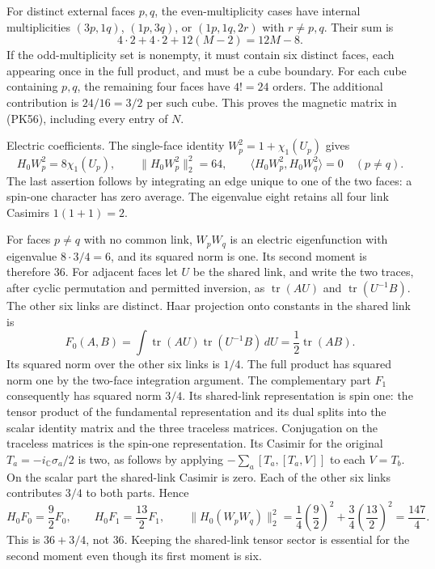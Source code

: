 \documentclass[11pt]{article}
\begin{document}
For distinct external faces \(p,q\), the even-multiplicity cases have
internal multiplicities \((3p,1q)\), \((1p,3q)\), or
\((1p,1q,2r)\) with \(r\ne p,q\). Their sum is
\[
 4\cdot2+4\cdot2+12(M-2)=12M-8.
\]
If the odd-multiplicity set is nonempty, it must contain six distinct faces,
each appearing once in the full product, and must be a cube boundary.
For each cube containing \(p,q\), the remaining four faces have \(4!=24\)
orders. The additional contribution is \(24/16=3/2\) per such cube.
This proves the magnetic matrix in (PK56), including every entry of \(N\).

Electric coefficients.
The single-face identity \(W_p^2=1+\chi_1(U_p)\) gives
\[
 H_0W_p^2=8\chi_1(U_p),\qquad
 \|H_0W_p^2\|_2^2=64,\qquad
 \langle H_0W_p^2,H_0W_q^2\rangle=0\quad(p\ne q).
\]
The last assertion follows by integrating an edge unique to one of the
two faces: a spin-one character has zero average. The eigenvalue eight
retains all four link Casimirs \(1(1+1)=2\).

For faces \(p\ne q\) with no common link, \(W_pW_q\) is an electric
eigenfunction with eigenvalue \(8\cdot3/4=6\), and its squared norm is one.
Its second moment is therefore \(36\).
For adjacent faces let \(U\) be the shared link, and write the two traces,
after cyclic permutation and permitted inversion, as
\(\operatorname{tr}(AU)\) and \(\operatorname{tr}(U^{-1}B)\).
The other six links are distinct. Haar projection onto constants in the
shared link is
\[
 F_0(A,B)=\int\operatorname{tr}(AU)\operatorname{tr}(U^{-1}B)\,dU
                  =\frac12\operatorname{tr}(AB).
\]
Its squared norm over the other six links is \(1/4\).
The full product has squared norm one by the two-face integration argument.
The complementary part \(F_1\) consequently has squared norm \(3/4\).
Its shared-link representation is spin one: the tensor product of the
fundamental representation and its dual splits into the scalar identity
matrix and the three traceless matrices. Conjugation on the traceless
matrices is the spin-one representation. Its Casimir for the original
\(T_a=-i_{\mathbb C}\sigma_a/2\) is two, as follows by applying
\(-\sum_a[T_a,[T_a,V]]\) to each \(V=T_b\).
On the scalar part the shared-link Casimir is zero. Each of the other
six links contributes \(3/4\) to both parts. Hence
\[
 H_0F_0=\frac92F_0,\qquad H_0F_1=\frac{13}2F_1,\qquad
 \|H_0(W_pW_q)\|_2^2
  =\frac14\left(\frac92\right)^2
       +\frac34\left(\frac{13}2\right)^2=\frac{147}4.
\]
This is \(36+3/4\), not \(36\). Keeping the shared-link tensor sector is
essential for the second moment even though its first moment is six.
\end{document}
